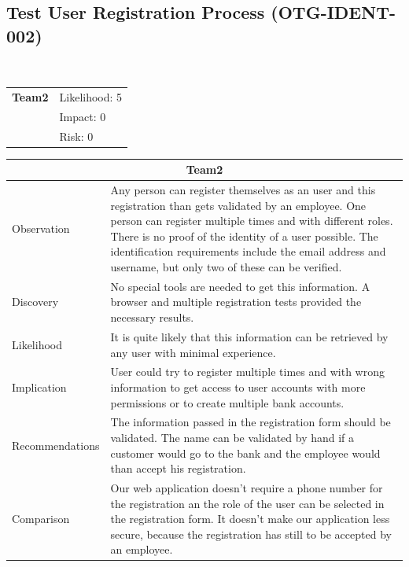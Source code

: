 \documentclass[headsepline,footsepline,footinclude=false,oneside,fontsize=11pt,paper=a4,listof=totoc,bibliography=totoc]{scrbook} %
\begin{document}
\pagebreak

\subsection{Test User Registration Process (OTG-IDENT-002)}\
\begin{tabular}{cR{12cm}}
	\textbf{Team2} & Likelihood: 5\\& Impact: 0\\& Risk: 0
\end{tabular}

\begin{tabular}{ l|p{11cm}  }
	\hline
	\multicolumn{2}{c}{\textbf{Team2}} \\
	\hline
	Observation   & Any person can register themselves as an user and this registration than gets validated by an employee. One person can register multiple times and with different roles. There is no proof of the identity of a user possible. The identification requirements include the email address and username, but only two of these can be verified. \\
	Discovery  & No special tools are needed to get this information. A browser and multiple registration tests provided the necessary results. \\
	Likelihood & It is quite likely that this information can be retrieved by any user with minimal experience. \\
	Implication    & User could try to register multiple times and with wrong information to get access to user accounts with more permissions or to create multiple bank accounts. \\
	Recommendations & The information passed in the registration form should be validated. The name can be validated by hand if a customer would go to the bank and the employee would than accept his registration. \\
	Comparison & Our web application doesn't require a phone number for the registration an the role of the user can be selected in the registration form. It doesn't make our application less secure, because the registration has still to be accepted by an employee. \\
	\hline
\end{tabular}
\\
\vspace{0.5cm}
\\
\end{document}
